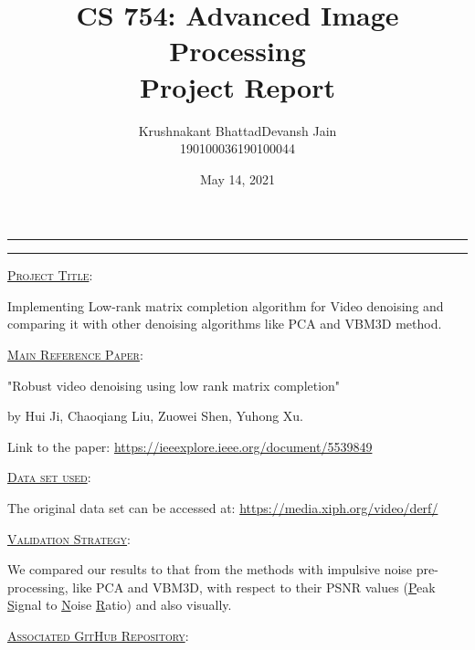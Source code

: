 \documentclass[fleqn, 11pt]{article}
\title{CS 754: Advanced Image Processing \\ Project Report}
\author{ 
\begin{tabular}{|c|c|}
     \hline
     \textsf{Krushnakant Bhattad} & \textsf{ \hspace{5pt} Devansh Jain \hspace{5pt} } \\
     \hline
     \textsf{190100036} & \textsf{190100044}\\
     \hline
\end{tabular}
}
\date{May 14, 2021}
\newcommand{\myline}{
  \par
  \kern3pt %
  \hrule height 0.5pt
  \kern2pt %
  \hrule height 0.5pt
  \kern3pt %
  \par
}
\renewcommand{\arraystretch}{2}%
\begin{document}
\maketitle
\thispagestyle{empty}
\renewcommand{\arraystretch}{1}%

\myline 

\vspace{7pt}

\underline{\large {\textsc{Project Title}}}: 

\medskip  

Implementing Low-rank matrix completion algorithm for Video denoising and comparing it with other denoising algorithms like PCA and VBM3D method. 

\hrulefill 

\vspace{10pt}

\underline{\large {\textsc{Main Reference Paper}}}: 

\medskip 

"Robust video denoising using low rank matrix completion"

by Hui Ji, Chaoqiang Liu, Zuowei Shen, Yuhong Xu.

Link to the paper: \url{https://ieeexplore.ieee.org/document/5539849}

\hrulefill

\vspace{10pt}

\underline{\large {\textsc{Data set used}}}: 

\medskip 

The original data set can be accessed at: \url{https://media.xiph.org/video/derf/}

\hrulefill

\vspace{10pt}

\underline{\large {\textsc{Validation Strategy}}}: 

\medskip 

We compared our results to that from the methods with impulsive noise pre-processing, like PCA and VBM3D, with respect to their PSNR values (\underline{P}eak \underline{S}ignal to \underline{N}oise \underline{R}atio) and also visually.

\hrulefill

\vspace{10pt}

\underline{\large {\textsc{Associated GitHub Repository}}}:

\medskip
\end{document}
